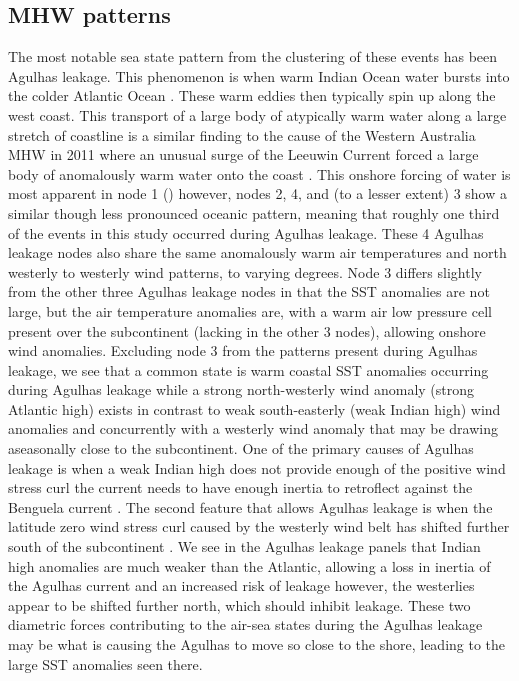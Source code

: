 \documentclass[a4paper,10pt,review]{elsarticle}
\begin{document}
\subsection{MHW patterns}
The most notable sea state pattern from the clustering of these events has been Agulhas leakage. This phenomenon is when warm Indian Ocean water bursts into the colder Atlantic Ocean \citep{Beal2011}. These warm eddies then typically spin up along the west coast. This transport of a large body of atypically warm water along a large stretch of coastline is a similar finding to the cause of the Western Australia MHW in 2011 where an unusual surge of the Leeuwin Current forced a large body of anomalously warm water onto the coast \citep{Feng2013, Benthuysen2014}. This onshore forcing of water is most apparent in node 1 () however, nodes 2, 4, and (to a lesser extent) 3 show a similar though less pronounced oceanic pattern, meaning that roughly one third of the events in this study occurred during Agulhas leakage. These 4 Agulhas leakage nodes also share the same anomalously warm air temperatures and north westerly to westerly wind patterns, to varying degrees. Node 3 differs slightly from the other three Agulhas leakage nodes in that the SST anomalies are not large, but the air temperature anomalies are, with a warm air low pressure cell present over the subcontinent (lacking in the other 3 nodes), allowing onshore wind anomalies. Excluding node 3 from the patterns present during Agulhas leakage, we see that a common state is warm coastal SST anomalies occurring during Agulhas leakage while a strong north-westerly wind anomaly (strong Atlantic high) exists in contrast to weak south-easterly (weak Indian high) wind anomalies and concurrently with a westerly wind anomaly that may be drawing aseasonally close to the subcontinent. One of the primary causes of Agulhas leakage is when a weak Indian high does not provide enough of the positive wind stress curl the current needs to have enough inertia to retroflect against the Benguela current \citep{Beal2011}. The second feature that allows Agulhas leakage is when the latitude zero wind stress curl caused by the westerly wind belt has shifted further south of the subcontinent \citep{Beal2011}. We see in the Agulhas leakage panels that Indian high anomalies are much weaker than the Atlantic, allowing a loss in inertia of the Agulhas current and an increased risk of leakage however, the westerlies appear to be shifted further north, which should inhibit leakage. These two diametric forces contributing to the air-sea states during the Agulhas leakage may be what is causing the Agulhas to move so close to the shore, leading to the large SST anomalies seen there. 
\end{document}
